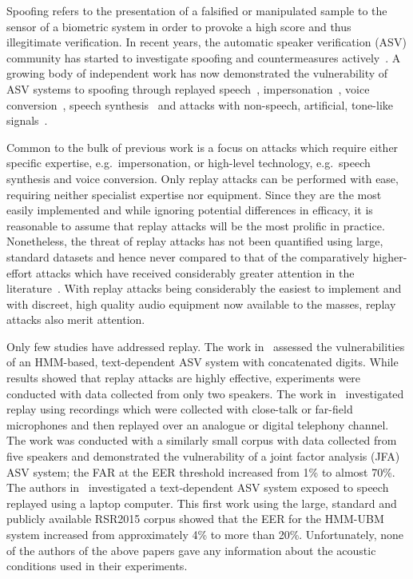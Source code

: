 
Spoofing refers to the presentation of a falsified or manipulated sample 
to the sensor of a biometric system in order to provoke a high score and 
thus illegitimate verification.
In recent years, the automatic speaker verification (ASV) community has 
started to investigate spoofing and countermeasures 
actively~\cite{interspeechSpecialSession, Wu2014a}. 
A growing 
body of independent work has now demonstrated the vulnerability of ASV 
systems to spoofing through 
replayed speech~\cite{Lindberg1999,Villalba2010},
impersonation~\cite{Blomberg2004,Farrus2008}, voice 
conversion~\cite{Perrot2005, Pellom1999}, speech 
synthesis~\cite{Masuko1999, Leon2010} and attacks with non-speech, 
artificial, tone-like signals~\cite{Alegre2012a,Alegre2012b}.

Common to the bulk of previous work is a focus on attacks 
which require either specific expertise, e.g.~impersonation, or high-level 
technology, e.g.~speech synthesis and voice conversion. 
Only replay attacks can be performed with ease, requiring neither specialist 
expertise nor equipment.  Since they are the most easily 
implemented and while ignoring potential differences in efficacy, 
it is reasonable to assume that replay attacks will be the most prolific
in practice.  Nonetheless, the threat of 
replay attacks has not been quantified using large, standard 
datasets and hence never compared to that of the comparatively higher-effort
attacks which have received considerably greater attention in the
literature~\cite{Wu2014a,handbookChapter}.
With replay attacks being considerably the easiest to implement
and with discreet, high quality audio equipment now available to the masses,
replay attacks also merit attention.

Only few studies have addressed replay.  
The work in~\cite{Lindberg1999} assessed the vulnerabilities of an HMM-based, text-dependent ASV system with concatenated digits.  
While results showed that replay attacks are highly effective, experiments were conducted with data collected from only two speakers.
The work in~\cite{Villalba2010} investigated replay using recordings which were collected with close-talk or far-field microphones and then replayed over an analogue or digital telephony channel. 
The work was conducted with a similarly small corpus with data collected from five speakers and demonstrated the vulnerability of a joint factor analysis (JFA) ASV system; the FAR at the EER threshold increased from 1\% to almost 70\%. 
The authors in~\cite{Wu2014} investigated a text-dependent 
ASV system exposed to speech replayed using a laptop computer. 
This first work using the large, standard and publicly available RSR2015 corpus showed that the EER for the HMM-UBM system increased from approximately 4\% to more than 20\%. Unfortunately, none of the authors of the above papers gave any information about the acoustic conditions used in their experiments.

